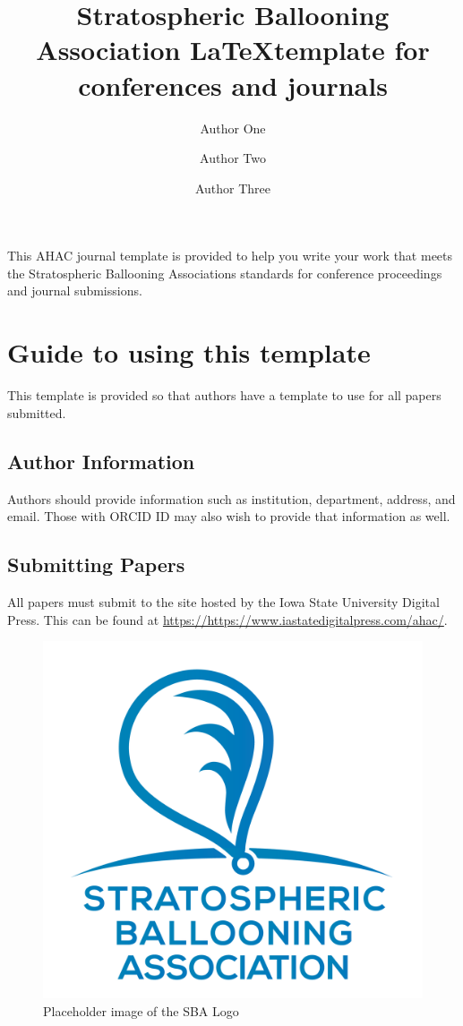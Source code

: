 \documentclass[12pt]{sba}
\title{Stratospheric Ballooning Association \LaTeX template for conferences and journals}
\author[1,a]{Author One}
\author[2,b]{Author Two}
\author[3,c]{Author Three}
\affil[a]{Affiliation One}
\affil[b]{Affiliation Two}
\affil[c]{Affiliation Three}
\begin{document}
\maketitle
{}

\showacknow %
\newpage
\justifying
\noindent This AHAC journal template is provided to help you write your work that meets the Stratospheric Ballooning Associations standards for conference proceedings and journal submissions.

\section*{Guide to using this template}

This template is provided so that authors have a template to use for all papers submitted. 

\subsection*{Author Information}
Authors should provide information such as institution, department, address, and email.  Those with ORCID ID may also wish to provide that information as well.

\subsection*{Submitting Papers}
All papers must submit to the site hosted by the Iowa State University Digital Press.  This can be found at \href{https://www.iastatedigitalpress.com/ahac/}{https://https://www.iastatedigitalpress.com/ahac/}. 

\begin{figure}%
\centering
\includegraphics[width=.8\linewidth]{images/SBA_logo.png}
\caption{Placeholder image of the SBA Logo}
\label{fig:SBA}
\end{figure}
\end{document}
